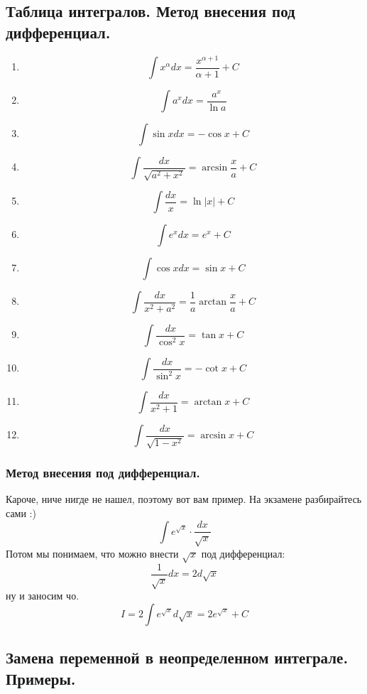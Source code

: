 \documentclass[a4paper,12pt]{article}
\theoremstyle{plain} %
\theoremstyle{definition} %
\theoremstyle{remark} %
\begin{document}
\newpage
{}
\subsection*{Таблица интегралов. Метод внесения под дифференциал.}

\begin{enumerate}
	\item \[ \int x^{\alpha} dx = \frac{x^{\alpha + 1}}{\alpha + 1} + C \]
	\item \[ \int a^x dx = \frac{a^x}{\ln a} \]
	\item \[ \int \sin x dx = - \cos x + C \]
	\item \[ \int \frac{dx}{\sqrt{a^2 + x^2}} = \arcsin \frac{x}{a} + C \]
	\item \[ \int \frac{dx}{x} = \ln |x| +C \]
	\item \[ \int e^x dx = e^x + C \]
	\item \[ \int \cos x dx = \sin x + C \]
	\item \[ \int \frac{dx}{x^2 + a^2} = \frac{1}{a} \arctan \frac{x}{a} +C \]
	\item \[ \int \frac{dx}{\cos^2x} = \tan x + C \]
	\item \[ \int \frac{dx}{\sin^2x} = - \cot x + C \]
	\item \[ \int \frac{dx}{x^2 + 1} = \arctan x + C \]
	\item \[ \int \frac{dx}{\sqrt{1 - x^2}} = \arcsin x + C \]
\end{enumerate}

\subsubsection*{Метод внесения под дифференциал.}
Кароче, ниче нигде не нашел, поэтому вот вам пример. На экзамене разбирайтесь сами :)
\[
	\int e^{\sqrt{x}} \cdot \frac{dx}{\sqrt{x}}
\]
Потом мы понимаем, что можно внести $\sqrt{x}$ под дифференциал:
\[
	\frac{1}{\sqrt{x}} dx = 2d\sqrt{x}
\]
ну и заносим чо.
\[
	I = 2 \int e^{\sqrt{x}} d \sqrt{x} = 2 e^{\sqrt{x}} + C
\]


\newpage
{}
\subsection*{Замена переменной в неопределенном интеграле. Примеры.}

\newpage
{}
\end{document}
